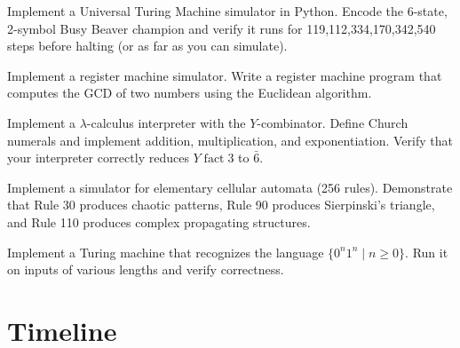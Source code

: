 \begin{exercise}[Computational]
Implement a Universal Turing Machine simulator in Python. Encode the 6-state, 2-symbol Busy Beaver champion and verify it runs for 119,112,334,170,342,540 steps before halting (or as far as you can simulate).
\end{exercise}

\begin{exercise}[Computational]
Implement a register machine simulator. Write a register machine program that computes the GCD of two numbers using the Euclidean algorithm.
\end{exercise}

\begin{exercise}[Computational]
Implement a $\lambda$-calculus interpreter with the $Y$-combinator. Define Church numerals and implement addition, multiplication, and exponentiation. Verify that your interpreter correctly reduces $Y\;\text{fact}\;3$ to $\bar{6}$.
\end{exercise}

\begin{exercise}[Computational]
Implement a simulator for elementary cellular automata (256 rules). Demonstrate that Rule 30 produces chaotic patterns, Rule 90 produces Sierpinski's triangle, and Rule 110 produces complex propagating structures.
\end{exercise}

\begin{exercise}[Computational]
Implement a Turing machine that recognizes the language $\{0^n 1^n \mid n \geq 0\}$. Run it on inputs of various lengths and verify correctness.
\end{exercise}

\section{Timeline}
\label{sec:computation:timeline}

